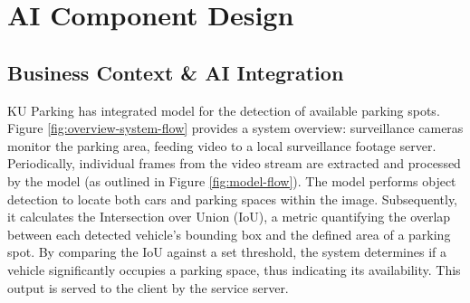 \chapter{AI Component Design}
\label{chap:ai-component-design}





\section{Business Context \& AI Integration}
\label{section:business-context-ai-integration}

KU Parking has integrated model for the detection of available parking spots. Figure \ref{fig:overview-system-flow} provides a system overview: surveillance cameras monitor the parking area, feeding video to a local surveillance footage server. Periodically, individual frames from the video stream are extracted and processed by the model (as outlined in Figure \ref{fig:model-flow}). The model performs object detection to locate both cars and parking spaces within the image. Subsequently, it calculates the Intersection over Union (IoU), a metric quantifying the overlap between each detected vehicle's bounding box and the defined area of a parking spot. By comparing the IoU against a set threshold, the system determines if a vehicle significantly occupies a parking space, thus indicating its availability. This output is served to the client by the service server.

